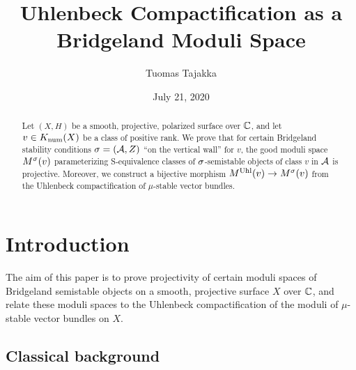 \documentclass[letterpaper,11pt]{amsart}%
\title{Uhlenbeck Compactification as a Bridgeland Moduli Space}
\author{Tuomas Tajakka}
\date{July 21, 2020}
\theoremstyle{remark}
\begin{document}
\maketitle

\begin{abstract}
    Let $(X,H)$ be a smooth, projective, polarized surface over $\mathbb{C}$, and let $v \in K_{\mathrm{num}}(X)$ be a class of positive rank. We prove that for certain Bridgeland stability conditions $\sigma = (\mathcal{A}, Z)$ ``on the vertical wall'' for $v$, the good moduli space $M^\sigma(v)$ parameterizing S-equivalence classes of $\sigma$-semistable objects of class $v$ in $\mathcal{A}$ is projective. Moreover, we construct a bijective morphism $M^{\mathrm{Uhl}}(v) \to M^\sigma(v)$ from the Uhlenbeck compactification of $\mu$-stable vector bundles.
\end{abstract}

\tableofcontents


\section{Introduction}
The aim of this paper is to prove projectivity of certain moduli spaces of Bridgeland semistable objects on a smooth, projective surface $X$ over $\mathbb{C}$, and relate these moduli spaces to the Uhlenbeck compactification of the moduli of $\mu$-stable vector bundles on $X$.


\subsection*{Classical background}
\end{document}
